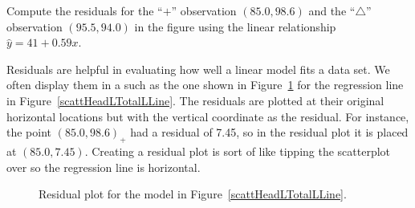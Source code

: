 \begin{exercisewrap}
\begin{nexercise}
Compute the residuals for the ``$+$'' observation $(85.0, 98.6)$
and the ``$\triangle$'' observation $(95.5, 94.0)$ in the figure
using the linear relationship $\hat{y} = 41 + 0.59x$.\footnotemark{}
\end{nexercise}
\end{exercisewrap}

Residuals are helpful in evaluating how well a linear model
fits a data set.
We often display them in a  such as the
one shown in Figure~\ref{scattHeadLTotalLResidualPlot}
for the regression line in Figure~\ref{scattHeadLTotalLLine}.
The residuals are plotted at their original horizontal locations
but with the vertical coordinate as the residual.
For instance, the point $(85.0,98.6)_{+}$ had a residual
of 7.45, so in the residual plot it is placed at $(85.0, 7.45)$.
Creating a residual plot is sort of like tipping the
scatterplot over so the regression line is horizontal. 

\begin{figure}[h]
  \centering
  \caption{Residual plot for the model in
      Figure~\ref{scattHeadLTotalLLine}.}
  \label{scattHeadLTotalLResidualPlot}
\end{figure}

\D{\newpage}

